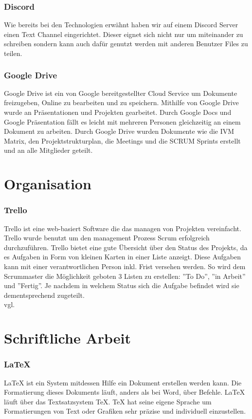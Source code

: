 \subsubsection {Discord}
\label{sec:Discord}
Wie bereits bei den Technologien erwähnt haben wir auf einem Discord Server einen Text Channel eingerichtet. Dieser eignet sich nicht nur um miteinander zu schreiben sondern kann auch dafür genutzt werden mit anderen Benutzer Files zu teilen. 
\subsubsection {Google Drive}
\label{sec:GoogleDrive}
Google Drive ist ein von Google bereitgestellter Cloud Service um Dokumente freizugeben, Online zu bearbeiten und zu speichern.
Mithilfe von Google Drive wurde an Präsentationen und Projekten gearbeitet. Durch Google Docs und Google Präsentation fällt es leicht mit mehreren Personen gleichzeitig an einem Dokument zu arbeiten. Durch Google Drive wurden Dokumente wie die IVM Matrix, den Projektstrukturplan, die Meetings und die SCRUM Sprints erstellt und an alle Mitglieder geteilt. 
\section{Organisation}
\label{sec:Organisation}
\subsubsection {Trello}
\label{sec:Trello}
Trello ist eine web-basiert Software die das managen von Projekten vereinfacht. Trello wurde benutzt um den management Prozess Scrum erfolgreich durchzuführen. Trello bietet eine gute Übersicht über den Status des Projekts, da es Aufgaben in Form von kleinen Karten in einer Liste anzeigt. Diese Aufgaben kann mit einer verantwortlichen Person inkl. Frist versehen werden. So wird dem Scrummaster die Möglichkeit geboten 3 Listen zu erstellen: ''To Do'', ''in Arbeit'' und ''Fertig''. Je nachdem in welchem Status sich die Aufgabe befindet wird sie dementsprechend zugeteilt. \\vgl. \cite{trello} 
\section{Schriftliche Arbeit}
\label{sec:TechSchriftlicheArbeit}
\subsubsection {LaTeX}
\label{sec:LaTeX}
LaTeX ist ein System mitdessen Hilfe ein Dokument erstellen werden kann. Die Formatierung dieses Dokuments läuft, anders als bei Word, über Befehle. LaTeX läuft über das Textsatzsystem TeX. TeX hat seine eigene Sprache um Formatierungen von Text oder Grafiken sehr präzise und individuell einzustellen. 
